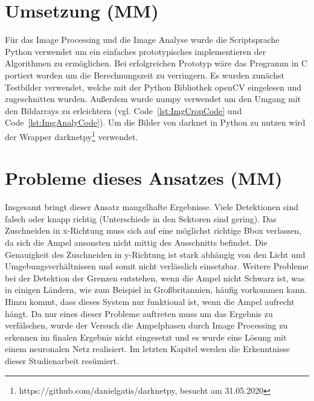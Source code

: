 \documentclass[a4paper,oneside,12pt]{report}
\begin{document}
\begin{onehalfspace}
		\section{Umsetzung (MM)}
		Für das Image Processing und die Image Analyse wurde die Scriptsprache Python verwendet um ein einfaches prototypisches implementieren der Algorithmen zu ermöglichen. Bei erfolgreichen Prototyp wäre das Programm in C portiert worden um die Berechnungszeit zu verringern. Es wurden zunächst Testbilder verwendet, welche mit der Python Bibliothek openCV eingelesen und zugeschnitten wurden. Außerdem wurde numpy verwendet um den Umgang mit den Bildarrays zu erleichtern (vgl. Code~\ref{lst:ImgCropCode} und Code~\ref{lst:ImgAnalyCode}). Um die Bilder von darknet in Python zu nutzen wird der Wrapper darknetpy\footnote{https://github.com/danielgatis/darknetpy, besucht am 31.05.2020} verwendet.
		
		
		\section{Probleme dieses Ansatzes (MM)}
		Insgesamt bringt dieser Ansatz mangelhafte Ergebnisse. Viele Detektionen sind falsch oder knapp richtig (Unterschiede in den Sektoren sind gering). Das Zuschneiden in x-Richtung muss sich auf eine möglichst richtige Bbox verlassen, da sich die Ampel ansonsten nicht mittig des Ausschnitts befindet. Die Genauigkeit des Zuschneiden in y-Richtung ist stark abhängig von den Licht und Umgebungsverhältnissen und somit nicht verlässlich einsetzbar. Weitere Probleme bei der Detektion der Grenzen entstehen, wenn die Ampel nicht Schwarz ist, was in einigen Ländern, wie zum Beispiel in Großbritannien, häufig vorkommen kann. Hinzu kommt, dass dieses System nur funktional ist, wenn die Ampel aufrecht hängt. Da nur eines dieser Probleme auftreten muss um das Ergebnis zu verfälschen, wurde der Versuch die Ampelphasen durch Image Processing zu erkennen im finalen Ergebnis nicht eingesetzt und es wurde eine Lösung mit einem neuronalen Netz realisiert. \newline Im letzten Kapitel werden die Erkenntnisse dieser Studienarbeit resümiert.
		
		
	\end{onehalfspace}
	
\end{document}

